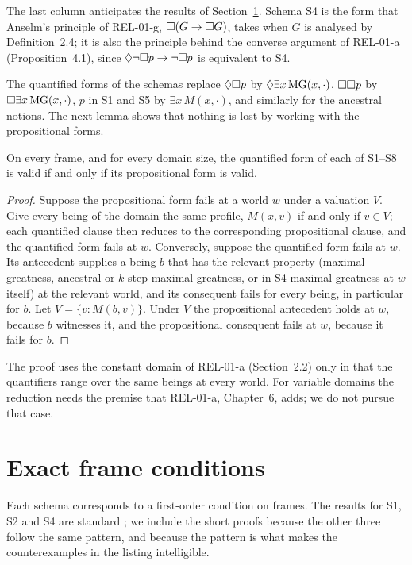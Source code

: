 \documentclass{situationist-preprint}
\newcommand{\MG}{\mathrm{MG}}
\begin{document}
The last column anticipates the results of Section~\ref{s:corr}. Schema S4 is the form that Anselm's principle of REL-01-g, $\mathord{\Box}(G \to \mathord{\Box} G)$, takes when $G$ is analysed by Definition~2.4; it is also the principle behind the converse argument of REL-01-a (Proposition~4.1), since $\mathord{\Diamond}\neg\mathord{\Box} p \to \neg\mathord{\Box} p$ is equivalent to S4.

The quantified forms of the schemas replace $\mathord{\Diamond}\mathord{\Box} p$ by $\pos\exists x\,\MG(x,\cdot)$, $\mathord{\Box}\mathord{\Box} p$ by $\nec\exists x\,\MG(x,\cdot)$, $p$ in S1 and S5 by $\exists x\, M(x,\cdot)$, and similarly for the ancestral notions. The next lemma shows that nothing is lost by working with the propositional forms.

\begin{lemma}[Reduction]\label{l:reduction}
On every frame, and for every domain size, the quantified form of each of S1--S8 is valid if and only if its propositional form is valid.
\end{lemma}

\begin{proof}
Suppose the propositional form fails at a world $w$ under a valuation $V$. Give every being of the domain the same profile, $M(x,v)$ if and only if $v \in V$; each quantified clause then reduces to the corresponding propositional clause, and the quantified form fails at $w$. Conversely, suppose the quantified form fails at $w$. Its antecedent supplies a being $b$ that has the relevant property (maximal greatness, ancestral or $k$-step maximal greatness, or in S4 maximal greatness at $w$ itself) at the relevant world, and its consequent fails for every being, in particular for $b$. Let $V = \{v : M(b,v)\}$. Under $V$ the propositional antecedent holds at $w$, because $b$ witnesses it, and the propositional consequent fails at $w$, because it fails for $b$.
\end{proof}

The proof uses the constant domain of REL-01-a (Section~2.2) only in that the quantifiers range over the same beings at every world. For variable domains the reduction needs the premise that REL-01-a, Chapter~6, adds; we do not pursue that case.

\section{Exact frame conditions}\label{s:corr}

Each schema corresponds to a first-order condition on frames. The results for S1, S2 and S4 are standard \citep{HughesCresswell1996, Blackburn2001}; we include the short proofs because the other three follow the same pattern, and because the pattern is what makes the counterexamples in the listing intelligible.
\end{document}
